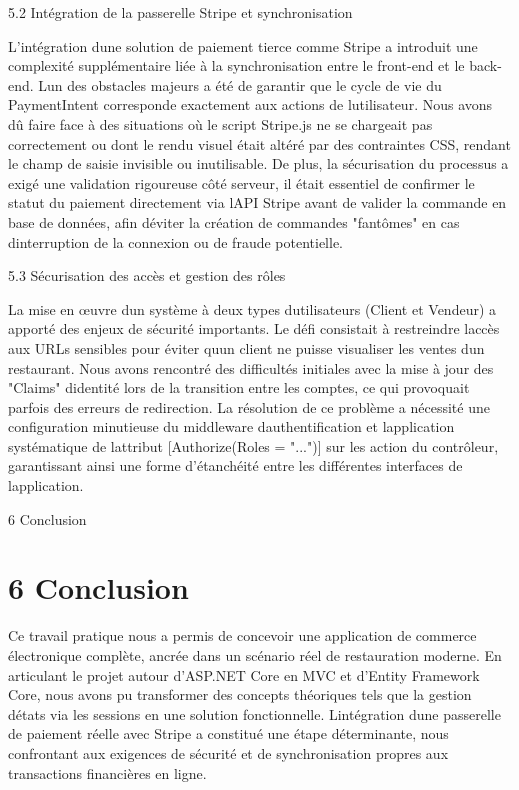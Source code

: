 \documentclass[
]{article}
\begin{document}
5.2 Intégration de la passerelle Stripe et synchronisation

L'intégration d\textquotesingle une solution de paiement tierce comme
Stripe a introduit une complexité supplémentaire liée à la
synchronisation entre le front-end et le back-end. L\textquotesingle un
des obstacles majeurs a été de garantir que le cycle de vie du
PaymentIntent corresponde exactement aux actions de
l\textquotesingle utilisateur. Nous avons dû faire face à des situations
où le script Stripe.js ne se chargeait pas correctement ou dont le rendu
visuel était altéré par des contraintes CSS, rendant le champ de saisie
invisible ou inutilisable. De plus, la sécurisation du processus a exigé
une validation rigoureuse côté serveur, il était essentiel de confirmer
le statut du paiement directement via l\textquotesingle API Stripe avant
de valider la commande en base de données, afin d\textquotesingle éviter
la création de commandes "fantômes" en cas
d\textquotesingle interruption de la connexion ou de fraude potentielle.

5.3 Sécurisation des accès et gestion des rôles

La mise en œuvre d\textquotesingle un système à deux types
d\textquotesingle utilisateurs (Client et Vendeur) a apporté des enjeux
de sécurité importants. Le défi consistait à restreindre
l\textquotesingle accès aux URLs sensibles pour éviter
qu\textquotesingle un client ne puisse visualiser les ventes
d\textquotesingle un restaurant. Nous avons rencontré des difficultés
initiales avec la mise à jour des "Claims" d\textquotesingle identité
lors de la transition entre les comptes, ce qui provoquait parfois des
erreurs de redirection. La résolution de ce problème a nécessité une
configuration minutieuse du middleware
d\textquotesingle authentification et l\textquotesingle application
systématique de l\textquotesingle attribut {[}Authorize(Roles =
"..."){]} sur les action du contrôleur, garantissant ainsi une forme
d'étanchéité entre les différentes interfaces de
l\textquotesingle application.

6 Conclusion

\section{6 Conclusion}\label{conclusion}

Ce travail pratique nous a permis de concevoir une application de
commerce électronique complète, ancrée dans un scénario réel de
restauration moderne. En articulant le projet autour d'ASP.NET Core en
MVC et d'Entity Framework Core, nous avons pu transformer des concepts
théoriques tels que la gestion d\textquotesingle états via les sessions
en une solution fonctionnelle. L\textquotesingle intégration
d\textquotesingle une passerelle de paiement réelle avec Stripe a
constitué une étape déterminante, nous confrontant aux exigences de
sécurité et de synchronisation propres aux transactions financières en
ligne.
\end{document}
